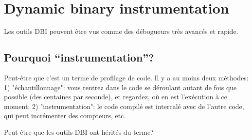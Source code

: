 \chapter{Dynamic binary instrumentation}

Les outils \ac{DBI} peuvent être vus comme des débogueurs très avancés et rapide.





\section{Pourquoi ``instrumentation''?}

Peut-être que c'est un terme de profilage de code.
Il y a au moins deux méthodes:
1) "échantillonnage": vous rentrez dans le code se déroulant autant de fois que possible
(des centaines par seconde), et regardez, où en est l'exécution à ce moment;
2) "instrumentation": le code compilé est intercalé avec de l'autre code, qui peut
incrémenter des compteurs, etc.

Peut-être que les outils \ac{DBI} ont hérités du terme?

